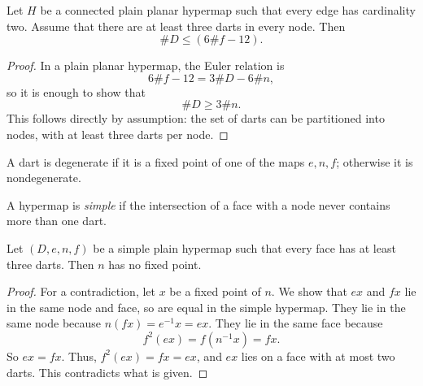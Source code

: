 \begin{lemma}\label{lemma:dart-upper} 
Let $H$ be a connected plain planar hypermap such that every edge has cardinality two.  Assume that
there are at least three darts in every node.  Then
$$
\# D \le (6 \#f - 12).
$$
\end{lemma}

\begin{proof}  In a plain planar hypermap, the Euler relation is
$$6 \#f - 12 = 3\#D - 6\#n,$$
so it is enough to show that
$$
\# D \ge 3\#n.
$$
This follows directly by assumption: the set of darts can be partitioned into nodes, with at least three darts per node.
\end{proof}


\begin{definition}[degenerate] A dart is degenerate if it is a
fixed point of one of the maps $e,n,f$; otherwise it is nondegenerate.  
\end{definition}

\begin{definition}[simple] 
A hypermap is {\it simple} if the intersection of a face with
a node never contains more than one dart.
\end{definition}


\begin{lemma} 
Let $(D,e,n,f)$ be a simple plain hypermap such that every face has
at least three darts.
Then $n$ has no fixed point.
\end{lemma}

\begin{proof}  For a contradiction, let $x$ be a fixed point of
$n$. We show that $e x$ and $f x$ lie in the same node and
face, so are equal in the simple hypermap.  
They lie in the same node because
$n(f x) = e^{-1} x = e x$. They lie in the same face because
    $$f^2 (e x) =  f(n^{-1} x) = f x.$$
So $e x = f x$.   Thus, $f^2 (e x) = f x = e x$, and $e x$ lies on a
face with at most two darts.  This contradicts what is given.
\end{proof}



